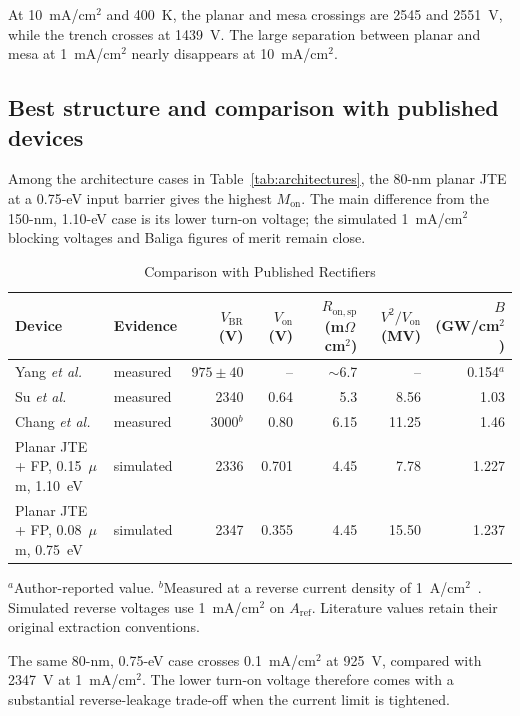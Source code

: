 \documentclass[journal,10pt]{IEEEtran}
\newcommand{\Ron}{\ensuremath{R_{\mathrm{on,sp}}}}
\begin{document}
At 10~mA/cm$^2$ and 400~K, the planar and mesa crossings are 2545 and 2551~V, while the trench crosses at 1439~V. The large separation between planar and mesa at 1~mA/cm$^2$ nearly disappears at 10~mA/cm$^2$.
\subsection{Best structure and comparison with published devices}
Among the architecture cases in Table~\ref{tab:architectures}, the 80-nm planar JTE at a 0.75-eV input barrier gives the highest $M_{\mathrm{on}}$. The main difference from the 150-nm, 1.10-eV case is its lower turn-on voltage; the simulated 1~mA/cm$^2$ blocking voltages and Baliga figures of merit remain close.

\begin{table}[!ht]
\caption{Comparison with Published Rectifiers}
\label{tab:literature}
\centering\scriptsize
\setlength{\tabcolsep}{2.2pt}
\begin{tabular}{>{\raggedright\arraybackslash}p{2.1cm}lrrrrr}
\toprule
Device & Evidence & $V_{\mathrm{BR}}$ (V) & $V_{\mathrm{on}}$ (V) & $\Ron$ (m$\Omega$\,cm$^2$) & $V^2/V_{\mathrm{on}}$ (MV) & $B$ (GW/cm$^2$)\\
\midrule
Yang \emph{et al.}~\cite{Yang2017} & measured & $975\pm40$ & -- & $\sim$6.7 & -- & 0.154$^{a}$\\
Su \emph{et al.}~\cite{Su2024_APL} & measured & 2340 & 0.64 & 5.3 & 8.56 & 1.03\\
Chang \emph{et al.}~\cite{Chang2025_APL} & measured & 3000$^{b}$ & 0.80 & 6.15 & 11.25 & 1.46\\
Planar JTE + FP, 0.15~$\mu$m, 1.10~eV & simulated & 2336 & 0.701 & 4.45 & 7.78 & 1.227\\
Planar JTE + FP, 0.08~$\mu$m, 0.75~eV & simulated & 2347 & 0.355 & 4.45 & 15.50 & 1.237\\
\bottomrule
\end{tabular}
\par\smallskip\begin{minipage}{0.98\columnwidth}\footnotesize
$^{a}$Author-reported value. $^{b}$Measured at a reverse current density of 1~A/cm$^2$~\cite{Chang2025_APL}. Simulated reverse voltages use 1~mA/cm$^2$ on $A_{\mathrm{ref}}$. Literature values retain their original extraction conventions.
\end{minipage}
\end{table}

The same 80-nm, 0.75-eV case crosses 0.1~mA/cm$^2$ at 925~V, compared with 2347~V at 1~mA/cm$^2$. The lower turn-on voltage therefore comes with a substantial reverse-leakage trade-off when the current limit is tightened.
\end{document}
